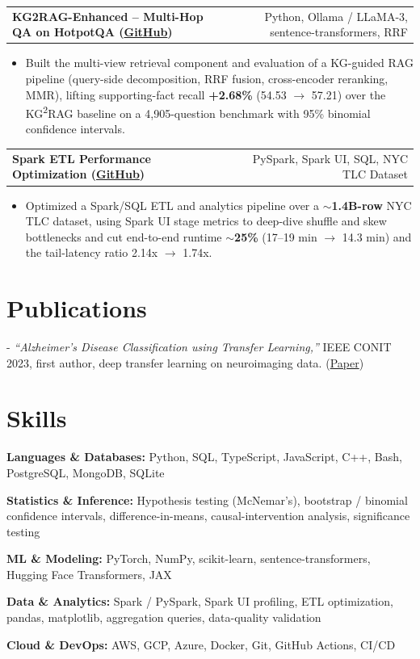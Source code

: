 \documentclass[letterpaper,11pt]{article}
\makeatletter
\newcommand{\projItem}[2]{%
  \vspace{2pt}
  \begin{tabular*}{\textwidth}{@{}l@{\extracolsep{\fill}}r@{}}
    \textbf{#1} & #2 \\
  \end{tabular*}\par\vspace{-3pt}
}
\newcommand{\skillLine}[2]{\textbf{#1:} #2\par\vspace{1.5pt}}
\newcommand{\inlineBlock}[1]{{\setlength{\leftskip}{0.18in}\small #1\par}}
\makeatother
\begin{document}
\projItem{KG2RAG-Enhanced -- Multi-Hop QA on HotpotQA {\normalfont\small(\href{https://github.com/Deva-1903/KG2RAG-685-NLP}{GitHub})}}{Python, Ollama / LLaMA-3, sentence-transformers, RRF}
\begin{itemize}
  \item Built the multi-view retrieval component and evaluation of a KG-guided RAG pipeline (query-side decomposition, RRF fusion, cross-encoder reranking, MMR), lifting supporting-fact recall \textbf{+2.68\%} (54.53 $\to$ 57.21) over the KG\textsuperscript{2}RAG baseline on a 4{,}905-question benchmark with 95\% binomial confidence intervals.
\end{itemize}

\projItem{Spark ETL Performance Optimization {\normalfont\small(\href{https://github.com/Deva-1903/Spark-ETL-Optimization}{GitHub})}}{PySpark, Spark UI, SQL, NYC TLC Dataset}
\begin{itemize}
  \item Optimized a Spark/SQL ETL and analytics pipeline over a \textbf{$\sim$1.4B-row} NYC TLC dataset, using Spark UI stage metrics to deep-dive shuffle and skew bottlenecks and cut end-to-end runtime \textbf{$\sim$25\%} (17--19 min $\to$ 14.3 min) and the tail-latency ratio 2.14x $\to$ 1.74x.
\end{itemize}

\section{Publications}
\vspace{2pt}
\inlineBlock{- \textit{``Alzheimer's Disease Classification using Transfer Learning,''} IEEE CONIT 2023, first author, deep transfer learning on neuroimaging data. {\normalfont\small(\href{https://ieeexplore.ieee.org/document/10205760}{Paper})}}

\section{Skills}
\skillLine{Languages \& Databases}{Python, SQL, TypeScript, JavaScript, C++, Bash, PostgreSQL, MongoDB, SQLite}
\skillLine{Statistics \& Inference}{Hypothesis testing (McNemar's), bootstrap / binomial confidence intervals, difference-in-means, causal-intervention analysis, significance testing}
\skillLine{ML \& Modeling}{PyTorch, NumPy, scikit-learn, sentence-transformers, Hugging Face Transformers, JAX}
\skillLine{Data \& Analytics}{Spark / PySpark, Spark UI profiling, ETL optimization, pandas, matplotlib, aggregation queries, data-quality validation}
\skillLine{Cloud \& DevOps}{AWS, GCP, Azure, Docker, Git, GitHub Actions, CI/CD}
\end{document}
